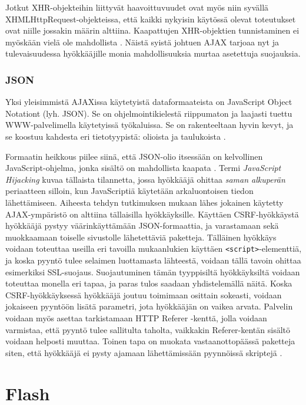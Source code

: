 Jotkut XHR-objekteihin liittyvät haavoittuvuudet ovat myös niin syvällä XHMLHttpRequest-objekteissa, että kaikki nykyisin käytössä olevat toteutukset ovat niille jossakin määrin alttiina. 
Kaapattujen XHR-objektien tunnistaminen ei myöskään vielä ole mahdollista \cite{AJAX}. Näistä syistä johtuen AJAX tarjoaa nyt ja tulevaisuudessa hyökkääjille monia mahdollisuuksia murtaa 
asetettuja suojauksia.

\subsubsection{JSON}

Yksi yleisimmistä AJAXissa käytetyistä dataformaateista on JavaScript Object Notationt (lyh. JSON). Se on ohjelmointikielestä riippumaton ja laajasti tuettu WWW-palvelimella käytetyissä 
työkaluissa. Se on rakenteeltaan hyvin kevyt, ja se koostuu kahdesta eri tietotyypistä: olioista ja taulukoista \cite{JSON}.

Formaatin heikkous piilee siinä, että JSON-olio itsessään on kelvollinen JavaScript-ohjelma, jonka sisältö on mahdollista kaapata \cite{AJAX}. Termi \emph{JavaScript Hijacking} kuvaa 
tällaista tilannetta, jossa hyökkääjä ohittaa \emph{saman alkuperän} periaatteen silloin, kun JavaScriptiä käytetään arkaluontoisen tiedon lähettämiseen. Aiheesta tehdyn tutkimuksen 
\cite{JSH} mukaan lähes jokainen käytetty AJAX-ympäristö on alttiina tällaisilla hyökkäyksille. Käyttäen CSRF-hyökkäystä hyökkääjä pystyy väärinkäyttämään JSON-formaattia, ja varastamaan 
sekä muokkaamaan toiselle sivustolle lähetettäviä paketteja.  Tälläinen hyökkäys voidaan toteuttaa useilla eri tavoilla mukaanlukien käyttäen \texttt{<script>}-elementtiä, ja koska pyyntö 
tulee selaimen luottamasta lähteestä, voidaan tällä tavoin ohittaa esimerkiksi SSL-suojaus\cite{AJAX}. Suojautuminen tämän tyyppisiltä hyökkäyksiltä voidaan toteuttaa monella eri tapaa, ja
paras tulos saadaan yhdistelemällä näitä. Koska CSRF-hyökkäyksessä hyökkääjä joutuu toimimaan osittain sokeasti, voidaan jokaiseen pyyntöön lisätä parametri, jota hyökkääjän on vaikea 
arvata. Palvelin voidaan myös asettaa tarkistamaan HTTP Referer -kenttä, jolla voidaan varmistaa, että pyyntö tulee sallitulta taholta, vaikkakin Referer-kentän sisältö voidaan helposti
muuttaa. Toinen tapa on muokata vastaanottopäässä paketteja siten, että hyökkääjä ei pysty ajamaan lähettämissään pyynnöissä skriptejä \cite{JSH}.

\section{Flash}

